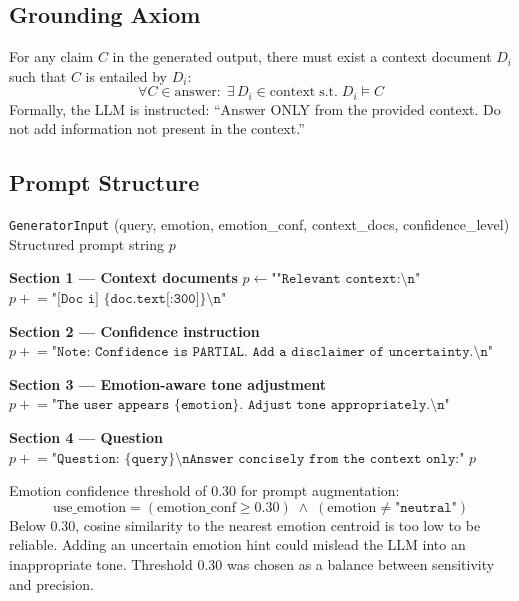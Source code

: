\documentclass[12pt,a4paper]{article}
\theoremstyle{definition}
\theoremstyle{plain}
\theoremstyle{remark}
\begin{document}
\subsection{Grounding Axiom}

\begin{tcolorbox}[axstyle, title={Axiom 4.1 — RAG Grounding Principle}]
For any claim $C$ in the generated output, there must exist a context document $D_i$ such that $C$ is entailed by $D_i$:
\[
\forall C \in \text{answer}: \;\exists\, D_i \in \text{context} \;\text{s.t.}\; D_i \models C
\]
Formally, the LLM is instructed: ``Answer ONLY from the provided context. Do not add information not present in the context.''
\end{tcolorbox}

\subsection{Prompt Structure}

\begin{algorithm}[H]
\caption{RAGPromptBuilder.build(gen\_input) $\to$ prompt\_string}
\begin{algorithmic}[1]
\Require \texttt{GeneratorInput} (query, emotion, emotion\_conf, context\_docs, confidence\_level)
\Ensure Structured prompt string $p$

\Statex \textbf{Section 1 — Context documents}
\State $p \gets \texttt{""Relevant context:\textbackslash n"}$
  \State $p \mathrel{+}= \texttt{"[Doc i] \{doc.text[:300]\}\textbackslash n"}$
\EndFor

\Statex \textbf{Section 2 — Confidence instruction}
  \State $p \mathrel{+}= \texttt{"Note: Confidence is PARTIAL. Add a disclaimer of uncertainty.\textbackslash n"}$
\EndIf

\Statex \textbf{Section 3 — Emotion-aware tone adjustment}
  \State $p \mathrel{+}= \texttt{"The user appears \{emotion\}. Adjust tone appropriately.\textbackslash n"}$
\EndIf

\Statex \textbf{Section 4 — Question}
\State $p \mathrel{+}= \texttt{"Question: \{query\}\textbackslash nAnswer concisely from the context only:"}$
\State \Return $p$
\end{algorithmic}
\end{algorithm}

\begin{tcolorbox}[thmstyle, title={Theorem 4.1 — Emotion Confidence Threshold for Tone Adjustment}]
Emotion confidence threshold of 0.30 for prompt augmentation:
\[
\text{use\_emotion} = (\text{emotion\_conf} \geq 0.30) \;\wedge\; (\text{emotion} \neq \texttt{"neutral"})
\]
Below 0.30, cosine similarity to the nearest emotion centroid is too low to be reliable. Adding an uncertain emotion hint could mislead the LLM into an inappropriate tone. Threshold 0.30 was chosen as a balance between sensitivity and precision.
\end{tcolorbox}
\end{document}

